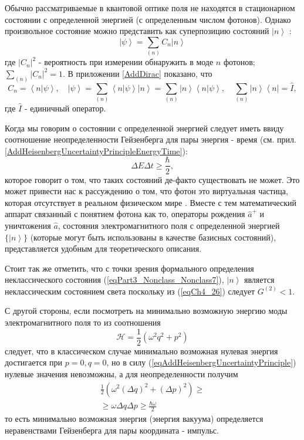 Обычно рассматриваемые в квантовой оптике поля не находятся в
стационарном состоянии с определенной энергией (с определенным числом
фотонов). Однако произвольное состояние можно представить как
суперпозицию состояний $\left|n\right>$ : 
\begin{equation}
\left|\psi\right> = \sum_{(n)} C_n \left|n\right>
\end{equation}
где $\left|C_n\right|^2$ - вероятность при измерении обнаружить в моде
$n$ фотонов; $\sum_{(n)} \left|C_n\right|^2 = 1$. 
В приложении \ref{AddDirac} показано, что
\[
C_n = \left< n \right.\left| \psi \right>, \quad
\left| \psi \right> = \sum_{(n)} \left< n \right.\left| \psi \right>
\left| n \right> =
\sum_{(n)} \left| n \right>\left< n \right.\left| \psi \right>,
\quad
\sum_{(n)} \left| n \right>\left< n \right| = \hat{I},
\]
где $\hat{I}$ - единичный оператор.

\begin{remark}
  Когда мы говорим о состоянии с определенной энергией следует иметь
  ввиду соотношение неопределенности Гейзенберга для пары
  энергия - время
  (см. прил. \ref{AddHeisenbergUncertaintyPrincipleEnergyTime}): 
  \[
  \Delta E \Delta t \ge \frac{\hbar}{2},
  \]
  которое говорит о том, что таких состояний де-факто существовать не
  может. Это может привести нас к рассуждению о том, что фотон это
  виртуальная частица, которая отсутствует в реальном физическом мире
  \cite{Lamb1995}. Вместе с тем математический аппарат связанный с
  понятием фотона как то, операторы рождения $\hat{a}^{+}$ и
  уничтожения $\hat{a}$, состояния электромагнитного поля с
  определенной энергией $\{\left|n\right>\}$ (которые могут быть
  использованы в качестве базисных состояний), представляется удобным
  для теоретического описания.

  Стоит так же отметить, что с точки зрения формального определения
  неклассического состояния (\ref{eqPart3_Nonclass_Nonclass7}),
  $\left|n\right>$ является неклассическим 
  состоянием света поскольку из (\ref{eqCh4_26}) следует $G^{(2)} <
  1$.

  С другой стороны, если посмотреть на минимально возможную энергию
  моды электромагнитного поля то из соотношения
  \[
  \mathcal{H} = \frac{1}{2}\left(\omega^2 q^2 + p^2\right)
  \]
  следует, что в классическом случае минимально возможная нулевая
  энергия достигается при $p = 0, q=0$, но в силу
  (\ref{eqAddHeisenbergUncertaintyPrinciple}) нулевые значения
  невозможны, а для неопределенности получим
  \begin{eqnarray}
    \frac{1}{2}\left(\omega^2 (\Delta q)^2 + (\Delta p)^2\right) \ge
    \nonumber \\
    \ge \omega \Delta q \Delta p \ge \frac{\hbar \omega}{2}
    \nonumber
  \end{eqnarray}
  то есть минимально возможная энергия (энергия вакуума) определяется
  неравенствами Гейзенберга для пары координата - импульс.  
  \label{rem:antiphoton}
\end{remark}
